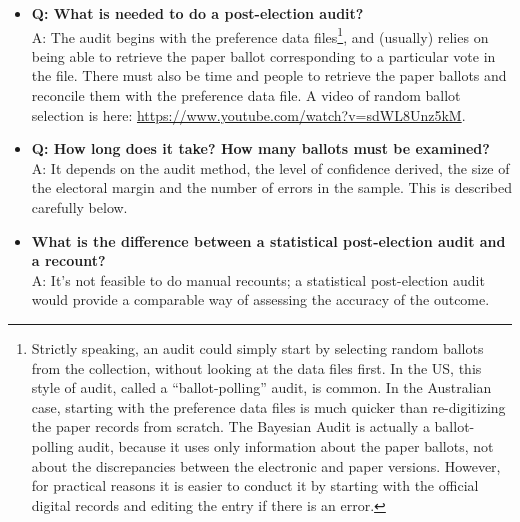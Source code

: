 \documentclass[10pt,a4paper]{article}
\begin{document}
\begin{itemize}
\item {\bf Q: What is needed to do a post-election audit?} \\
    A: The audit begins with the preference data files\footnote{Strictly speaking, an audit could simply start by selecting random ballots from the collection, without looking at the data files first.  In the US, this style of audit, called a ``ballot-polling'' audit, is common.  In the Australian case, starting with the preference data files is much quicker than re-digitizing the paper records from scratch.  The Bayesian Audit is actually a ballot-polling audit, because it uses only information about the paper ballots, not about the discrepancies between the electronic and paper versions.  However, for practical reasons it is easier to conduct it by starting with the official digital records and editing the entry if there is an error.}, and (usually) relies on being able to retrieve the paper ballot corresponding to a particular vote in the file.  There must also be  time and people to retrieve the paper ballots and reconcile them with the preference data file.  A video of random ballot selection is here: \url{https://www.youtube.com/watch?v=sdWL8Unz5kM}.
\item {\bf Q: How long does it take?  How many ballots must be examined?} \\ A: It depends on the audit method, the level of confidence derived, the size of the electoral margin and the number of errors in the sample.  This is described carefully below.    
\item {\bf What is the difference between a statistical post-election audit and a recount?} \\ A: It's not feasible to do manual recounts; a statistical post-election audit would provide a comparable way of assessing the accuracy of the  outcome.
\end{itemize}
\end{document}

